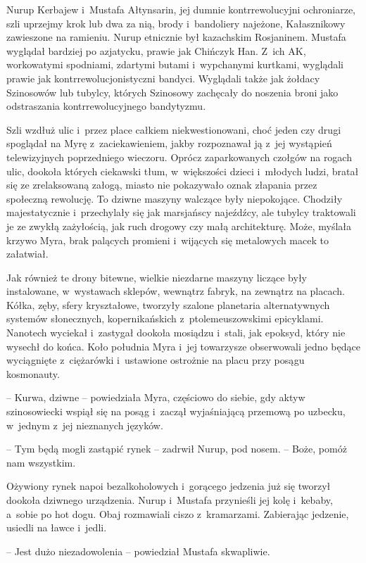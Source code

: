\documentclass[oneside,polish,11pt,sfheadings]{mwbk}
\begin{document}
Nurup Kerbajew i~Mustafa Ałtynsarin, jej dumnie kontrrewolucyjni
ochroniarze, szli uprzejmy krok lub dwa za nią, brody i~bandoliery
najeżone, Kałasznikowy zawieszone na ramieniu. Nurup etnicznie był
kazachskim Rosjaninem. Mustafa wyglądał bardziej po azjatycku, prawie jak
Chińczyk Han. Z~ich AK, workowatymi spodniami, zdartymi butami i~wypchanymi kurtkami, wyglądali prawie jak kontrrewolucjonistyczni
bandyci. Wyglądali także jak żołdacy Szinosowów lub tubylcy, których
Szinosowy zachęcały do noszenia broni jako odstraszania
kontrrewolucyjnego bandytyzmu.

Szli wzdłuż ulic i~przez place całkiem niekwestionowani, choć jeden czy
drugi spoglądał na Myrę z~zaciekawieniem, jakby rozpoznawał ją z~jej
wystąpień telewizyjnych poprzedniego wieczoru. Oprócz zaparkowanych
czołgów na rogach ulic, dookoła których ciekawski tłum, w~większości
dzieci i~młodych ludzi, bratał się ze zrelaksowaną załogą, miasto nie
pokazywało oznak złapania przez społeczną rewolucję. To dziwne maszyny
walczące były niepokojące. Chodziły majestatycznie i~przechylały się jak
marsjańscy najeźdźcy, ale tubylcy traktowali je ze zwykłą zażyłością,
jak ruch drogowy czy małą architekturę. Może, myślała krzywo Myra, brak
palących promieni i~wijących się metalowych macek to załatwiał.

Jak również te drony bitewne, wielkie niezdarne maszyny liczące były
instalowane, w~wystawach sklepów, wewnątrz fabryk, na zewnątrz na
placach. Kółka, zęby, sfery kryształowe, tworzyły szalone planetaria
alternatywnych systemów słonecznych, kopernikańskich z~ptolemeuszowskimi
epicyklami. Nanotech wyciekał i~zastygał dookoła mosiądzu i~stali, jak
epoksyd, który nie wysechł do końca. Koło południa Myra i~jej towarzysze
obserwowali jedno będące wyciągnięte z~ciężarówki i~ustawione ostrożnie
na placu przy posągu kosmonauty.

-- Kurwa, dziwne -- powiedziała Myra, częściowo do siebie, gdy aktyw
szinosowiecki wspiął się na posąg i~zaczął wyjaśniającą przemową po
uzbecku, w~jednym z~jej nieznanych języków.

-- Tym będą mogli zastąpić rynek -- zadrwił Nurup, pod nosem. -- Boże, pomóż
nam wszystkim.

Ożywiony rynek napoi bezalkoholowych i~gorącego jedzenia już się tworzył
dookoła dziwnego urządzenia. Nurup i~Mustafa przynieśli jej kolę i~kebaby, a~sobie po hot dogu. Obaj rozmawiali ciszo z~kramarzami.
Zabierając jedzenie, usiedli na ławce i~jedli.

-- Jest dużo niezadowolenia -- powiedział Mustafa skwapliwie.
\end{document}
